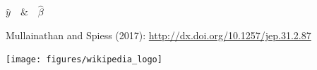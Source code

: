 \documentclass[aspectratio=169]{beamer}
\begin{document}
\begin{frame}

\begin{center}
\LARGE{
$ \hat{y} \quad \& \quad \hat{\beta}$
}
\end{center}

\vfill
\small{Mullainathan and Spiess (2017): \url{http://dx.doi.org/10.1257/jep.31.2.87}}
\end{frame}
\begin{frame}

\begin{center}
\texttt{[image: figures/wikipedia\_logo]}
\end{center}

\end{frame}
\end{document}
